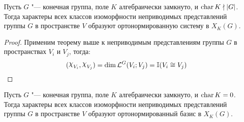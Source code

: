 \begin{corollary}
	Пусть $G$ "--- конечная группа, поле $K$ алгебраически замкнуто, и $\operatorname{char}{K} \nmid |G|$. Тогда характеры всех классов изоморфности неприводимых представлений группы $G$ в пространстве $V$ образуют ортонормированную систему в $X_K(G)$.
\end{corollary}

\begin{proof}
	Применим теорему выше к неприводимым представлениям группы $G$ в пространствах $V_i$ и $V_j$, тогда:
	\[(\Chi_{V_i}, \Chi_{V_j}) = \dim \mc L^G(V_i; V_j) = \mathbb I(V_i \cong V_j)\qedhere\]
\end{proof}

\begin{theorem}
	Пусть $G$ "--- конечная группа, поле $K$ алгебраически замкнуто, и $\operatorname{char}{K} = 0$. Тогда характеры всех классов изоморфности неприводимых представлений группы $G$ в пространстве $V$ образуют ортонормированный базис в $X_K(G)$.
\end{theorem}

